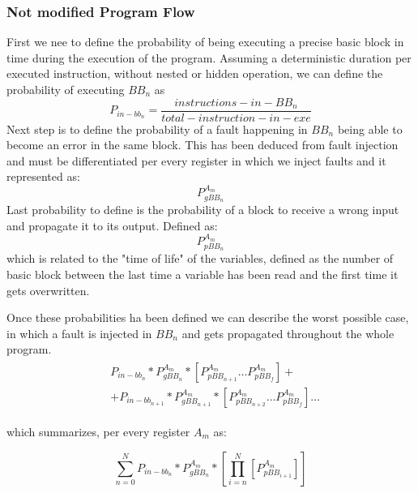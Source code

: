 \documentclass[./dissertation.tex]{subfiles}
\begin{document}
\subsubsection{Not modified Program Flow}
First we nee to define the probability of being executing a precise basic block in time during the execution of the program. Assuming a deterministic duration per executed instruction, without nested or hidden operation, we can define the probability of executing $BB_n$ as 
\begin{equation}
    P_{in-bb_n} = \frac{instructions-in-BB_n}{total-instruction-in-exe}
\end{equation}
Next step is to define the probability of a fault happening in $BB_n$ being able to become an error in the same block. This has been deduced from fault injection and must be differentiated per every register in which we inject faults and it represented as:
\begin{equation}
    P^{A_m}_{gBB_n}
\end{equation}
Last probability to define is the probability of a block to receive a wrong input and propagate it to its output. Defined as:
\begin{equation}
    P^{A_m}_{pBB_n} 
\end{equation}
which is related to the "time of life" of the variables, defined as the number of basic block between the last time a variable has been read and the first time it gets overwritten.



Once these probabilities ha been defined we can describe the worst possible case, in which a fault is injected in $BB_n$ and gets propagated throughout the whole program. 
\begin{align}
    \begin{split}
        & P_{in-bb_n} * P^{A_m}_{gBB_n} * \left[ P^{A_m}_{pBB_{n+1}} \dots P^{A_m}_{pBB_{f}}\right] +
   \\ &+  P_{in-bb_{n+1}} * P^{A_m}_{gBB_{n+1}} * \left[ P^{A_m}_{pBB_{n+2}} \dots P^{A_m}_{pBB_{f}}\right]\dots   
    \end{split}
\end{align}    



which summarizes, per every register $A_m$ as:

\begin{equation}
    	\sum_{n=0}^N  P_{in-bb_n} * P^{A_m}_{gBB_n} *\left[ \prod_{i=n}^N  \left[ P^{A_m}_{pBB_{i+1}} \right]\right]
\end{equation}
\end{document}
